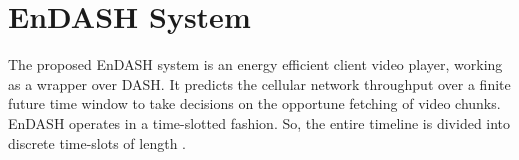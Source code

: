 \section{\textbf{EnDASH System}}\label{section:sys_overview}
The proposed EnDASH system is an energy efficient client video player, working as a wrapper over \ac{DASH}. It predicts the cellular network throughput over a finite future time window to take decisions on the opportune fetching of  video chunks.  EnDASH operates in a time-slotted fashion. So, the entire timeline is divided into discrete time-slots of length .
